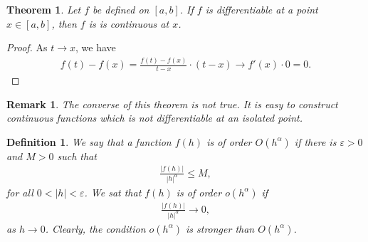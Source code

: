 \documentclass[11pt]{book}
\newtheorem{definition}{Definition}[chapter]
\newtheorem{theorem}{Theorem}[chapter]
\newtheorem{remark}{Remark}[chapter]
\theoremstyle{definition}
\numberwithin{equation}{chapter}
\begin{document}
\medskip

\begin{theorem}
Let $f$ be defined on $[a,b]$. If $f$ is differentiable at a point $x \in [a,b]$, then $f$ is is continuous at $x$.
\end{theorem}
\begin{proof}
As $t \to x$, we have 
\begin{align*}
    f(t) - f(x) = \frac{f(t) - f(x)}{t - x} \cdot (t - x) \to f'(x) \cdot 0 = 0.
\end{align*}
\end{proof}

\begin{remark}
The converse of this theorem is not true. It is easy to construct continuous functions which is not differentiable at an isolated point. 
\end{remark}

\medskip

\begin{definition}
We say that a function $f(h)$ is of order $O(h^{\alpha})$ if there is $\varepsilon > 0$ and $M > 0$ such that 
\begin{align*}
    \frac{\left|f(h)\right|}{\left|h\right|^{\alpha}} \leq M,
\end{align*}
for all $0 < \left|h\right| < \varepsilon$. We sat that $f(h)$ is of order $o(h^{\alpha})$ if 
\begin{align*}
    \frac{\left|f(h)\right|}{\left|h\right|^{\alpha}} \to 0,
\end{align*}
as $h \to 0$. Clearly, the condition $o(h^{\alpha})$ is stronger than $O(h^{\alpha})$. 
\end{definition}

\medskip
\end{document}
